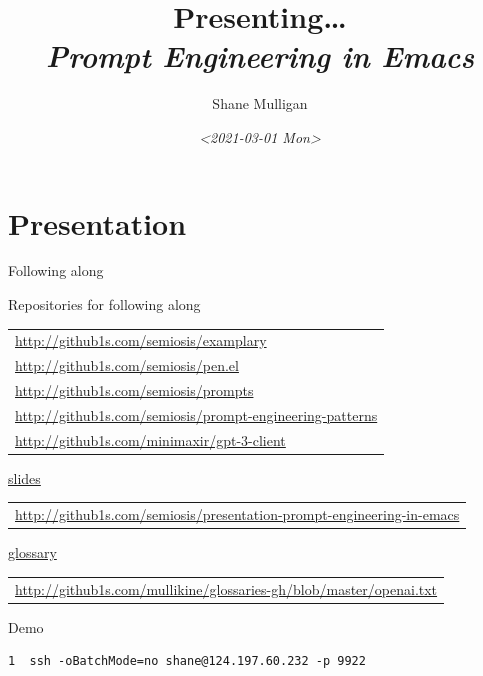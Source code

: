\documentclass[presentation]{beamer}
\author{Shane Mulligan \\  }
\date{\textit{<2021-03-01 Mon>}}
\title{Presenting\ldots{} \\   \emph{\alert{Prompt Engineering in Emacs}} \\  }
\begin{document}
\maketitle

\section{Presentation}
\label{sec:org66467c2}
\begin{frame}[label={sec:orgac8c43d},fragile]{Following along}
 \begin{block}{Repositories for following along}
{\footnotesize
\begin{center}
\begin{tabular}{l}
\url{http://github1s.com/semiosis/examplary}\\
\url{http://github1s.com/semiosis/pen.el}\\
\url{http://github1s.com/semiosis/prompts}\\
\url{http://github1s.com/semiosis/prompt-engineering-patterns}\\
\url{http://github1s.com/minimaxir/gpt-3-client}\\
\end{tabular}
\end{center}
}

{\tiny
\uline{\alert{slides}}
\begin{center}
\begin{tabular}{l}
\url{http://github1s.com/semiosis/presentation-prompt-engineering-in-emacs}\\
\end{tabular}
\end{center}
}

{\tiny
\uline{\alert{glossary}}
\begin{center}
\begin{tabular}{l}
\url{http://github1s.com/mullikine/glossaries-gh/blob/master/openai.txt}\\
\end{tabular}
\end{center}
}
\end{block}

\begin{block}{Demo}
{\footnotesize
\begin{verbatim}
1  ssh -oBatchMode=no shane@124.197.60.232 -p 9922
\end{verbatim}
}
\end{block}
\end{frame}
\end{document}
